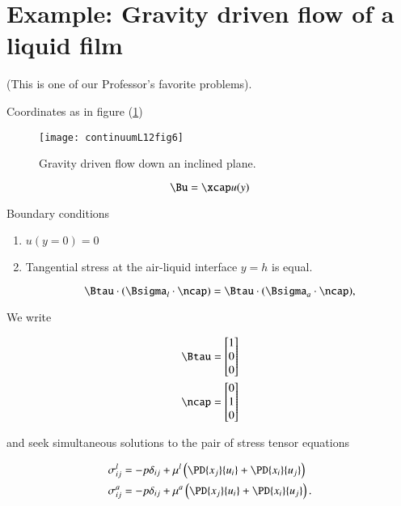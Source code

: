 \section{Example: Gravity driven flow of a liquid film}

(This is one of our Professor's favorite problems).

Coordinates as in figure (\ref{fig:continuumL12:continuumL12fig6})
\begin{figure}[htp]
   \centering
   \texttt{[image: continuumL12fig6]}
   \caption{Gravity driven flow down an inclined plane.}\label{fig:continuumL12:continuumL12fig6}
\end{figure}

\begin{equation}\label{eqn:continuumL12:150}
\Bu = \xcap u(y)
\end{equation}

Boundary conditions

\begin{enumerate}
\item $u(y = 0) = 0$
\item Tangential stress at the air-liquid interface $y = h$ is equal.

\begin{equation}\label{eqn:continuumL12:170}
\Btau \cdot (\Bsigma_l \cdot \ncap) = \Btau \cdot (\Bsigma_a \cdot \ncap),
\end{equation}
\end{enumerate}

We write 

\begin{align}\label{eqn:continuumL12:190}
\Btau &= 
\begin{bmatrix}
1 \\
0 \\
0
\end{bmatrix} \\
\ncap &= 
\begin{bmatrix}
0 \\
1 \\
0
\end{bmatrix}
\end{align}

and seek simultaneous solutions to the pair of stress tensor equations

\begin{align}\label{eqn:continuumL12:210}
\sigma_{ij}^l 
&= - p \delta_{ij} + \mu^l \left( 
\PD{x_j}{u_i} +
\PD{x_i}{u_j}
\right) \\
\sigma_{ij}^a 
&= - p \delta_{ij} + \mu^a \left( 
\PD{x_j}{u_i} +
\PD{x_i}{u_j}
\right).
\end{align}

